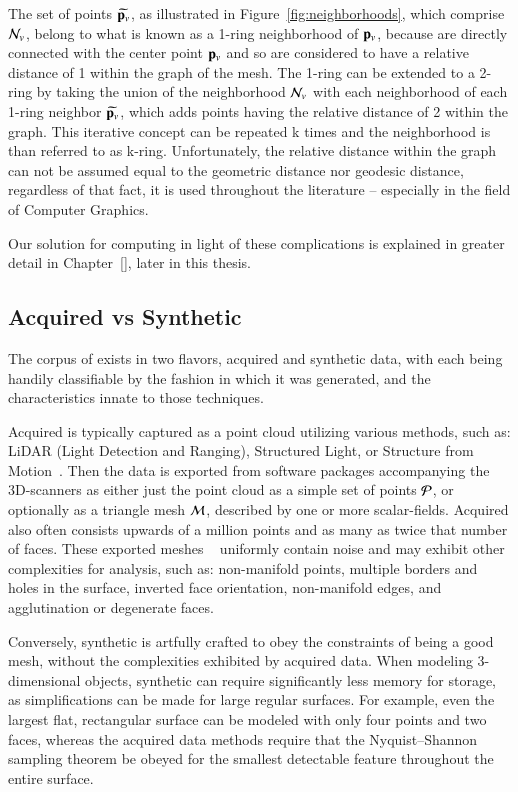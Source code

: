 The set of points $\widetilde{\mathbf{p}_v}$, as illustrated in Figure~\ref{fig:neighborhoods}, which comprise $\mathcal{N}_v$, belong to what is known as a 1-ring neighborhood of $\mathbf{p}_v$, because are directly connected with the center point $\mathbf{p}_v$ and so are considered to have a relative distance of 1 within the graph of the mesh. The 1-ring can be extended to a 2-ring by taking the union of the neighborhood $\mathcal{N}_v$ with each neighborhood of each 1-ring neighbor $\widetilde{\mathbf{p}_v}$, which adds points having the relative distance of 2 within the graph. This iterative concept can be repeated k times and the neighborhood is than referred to as k-ring. Unfortunately, the relative distance within the graph can not be assumed equal to the geometric distance nor geodesic distance, regardless of that fact, it is used throughout the literature – especially in the field of Computer Graphics.~\cite[p.~29]{Mara12}

Our solution for computing  in light of these complications is explained in greater detail in Chapter~\ref{}, later in this thesis.
%
\subsection{Acquired vs Synthetic \tdd{}}
\label{ch2s3ssAVS3}
The corpus of \tdd{} exists in two flavors, acquired and synthetic data, with each being handily classifiable by the fashion in which it was generated, and the characteristics innate to those techniques.

Acquired \tdd{} is typically captured as a point cloud utilizing various methods, such as: LiDAR (Light Detection and Ranging), Structured Light, or Structure from Motion~\cite[p.~19]{Mara12}. Then the data is exported from software packages accompanying the 3D-scanners as either just the point cloud as a simple set of points $\mathcal{P}$, or optionally as a triangle mesh $\mathcal{M}$, described by one or more scalar-fields. Acquired \tdd{} also often consists upwards of a million points and as many as twice that number of faces. These exported meshes ~\cite[p.~25]{Mara12} uniformly contain noise and may exhibit other complexities for analysis, such as: non-manifold points, multiple borders and holes in the surface, inverted face orientation, non-manifold edges, and agglutination or degenerate faces. ~\cite[p.~28-32]{Mara12}

Conversely, synthetic \tdd{} is artfully crafted to obey the constraints of being a good mesh, without the complexities exhibited by acquired data. When modeling 3-dimensional objects, synthetic \tdd{} can require significantly less memory for storage, as simplifications can be made for large regular surfaces. For example, even the largest flat, rectangular surface can be modeled with only four points and two faces, whereas the acquired data methods require that the Nyquist–Shannon sampling theorem be obeyed for the smallest detectable feature throughout the entire surface.~\cite[p.~19]{Mara12}~\cite[p.~3]{Mara17}

